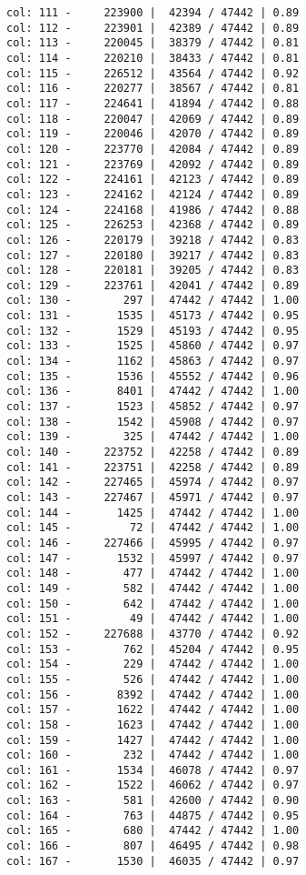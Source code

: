 \documentclass[11pt]{article}
\begin{document}
\begin{Verbatim}[commandchars=\\\{\}]
col: 111 -     223900 |  42394 / 47442 | 0.89
col: 112 -     223901 |  42389 / 47442 | 0.89
col: 113 -     220045 |  38379 / 47442 | 0.81
col: 114 -     220210 |  38433 / 47442 | 0.81
col: 115 -     226512 |  43564 / 47442 | 0.92
col: 116 -     220277 |  38567 / 47442 | 0.81
col: 117 -     224641 |  41894 / 47442 | 0.88
col: 118 -     220047 |  42069 / 47442 | 0.89
col: 119 -     220046 |  42070 / 47442 | 0.89
col: 120 -     223770 |  42084 / 47442 | 0.89
col: 121 -     223769 |  42092 / 47442 | 0.89
col: 122 -     224161 |  42123 / 47442 | 0.89
col: 123 -     224162 |  42124 / 47442 | 0.89
col: 124 -     224168 |  41986 / 47442 | 0.88
col: 125 -     226253 |  42368 / 47442 | 0.89
col: 126 -     220179 |  39218 / 47442 | 0.83
col: 127 -     220180 |  39217 / 47442 | 0.83
col: 128 -     220181 |  39205 / 47442 | 0.83
col: 129 -     223761 |  42041 / 47442 | 0.89
col: 130 -        297 |  47442 / 47442 | 1.00
col: 131 -       1535 |  45173 / 47442 | 0.95
col: 132 -       1529 |  45193 / 47442 | 0.95
col: 133 -       1525 |  45860 / 47442 | 0.97
col: 134 -       1162 |  45863 / 47442 | 0.97
col: 135 -       1536 |  45552 / 47442 | 0.96
col: 136 -       8401 |  47442 / 47442 | 1.00
col: 137 -       1523 |  45852 / 47442 | 0.97
col: 138 -       1542 |  45908 / 47442 | 0.97
col: 139 -        325 |  47442 / 47442 | 1.00
col: 140 -     223752 |  42258 / 47442 | 0.89
col: 141 -     223751 |  42258 / 47442 | 0.89
col: 142 -     227465 |  45974 / 47442 | 0.97
col: 143 -     227467 |  45971 / 47442 | 0.97
col: 144 -       1425 |  47442 / 47442 | 1.00
col: 145 -         72 |  47442 / 47442 | 1.00
col: 146 -     227466 |  45995 / 47442 | 0.97
col: 147 -       1532 |  45997 / 47442 | 0.97
col: 148 -        477 |  47442 / 47442 | 1.00
col: 149 -        582 |  47442 / 47442 | 1.00
col: 150 -        642 |  47442 / 47442 | 1.00
col: 151 -         49 |  47442 / 47442 | 1.00
col: 152 -     227688 |  43770 / 47442 | 0.92
col: 153 -        762 |  45204 / 47442 | 0.95
col: 154 -        229 |  47442 / 47442 | 1.00
col: 155 -        526 |  47442 / 47442 | 1.00
col: 156 -       8392 |  47442 / 47442 | 1.00
col: 157 -       1622 |  47442 / 47442 | 1.00
col: 158 -       1623 |  47442 / 47442 | 1.00
col: 159 -       1427 |  47442 / 47442 | 1.00
col: 160 -        232 |  47442 / 47442 | 1.00
col: 161 -       1534 |  46078 / 47442 | 0.97
col: 162 -       1522 |  46062 / 47442 | 0.97
col: 163 -        581 |  42600 / 47442 | 0.90
col: 164 -        763 |  44875 / 47442 | 0.95
col: 165 -        680 |  47442 / 47442 | 1.00
col: 166 -        807 |  46495 / 47442 | 0.98
col: 167 -       1530 |  46035 / 47442 | 0.97

\end{Verbatim}
\end{document}
